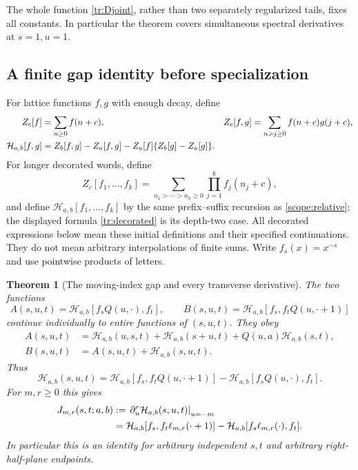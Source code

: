 \documentclass[11pt,letterpaper]{article}
\numberwithin{equation}{section}
\theoremstyle{plain}
\newtheorem{theorem}{Theorem}[section]
\theoremstyle{definition}
\theoremstyle{remark}
\newcommand{\HH}{\mathcal H}
\begin{document}
The whole function \eqref{tr:Djoint}, rather than two separately
regularized tails, fixes all constants. In particular the theorem covers
simultaneous spectral derivatives at $s=1,u=1$.

\subsection{A finite gap identity before specialization}

For lattice functions $f,g$ with enough decay, define
\begin{align}
 Z_c[f]&=\sum_{n\geq0}f(n+c),&
 Z_c[f,g]&=\sum_{n>j\geq0}f(n+c)g(j+c),\notag\\
 \HH_{a,b}[f,g]
   &=Z_b[f,g]-Z_a[f,g]-Z_a[f]\{Z_b[g]-Z_a[g]\}.
 \label{tr:decorated}
\end{align}
For longer decorated words, define
\[
 Z_c[f_1,\ldots,f_k]
   =\sum_{n_1>\cdots>n_k\geq0}\prod_{j=1}^k f_j(n_j+c),
\]
and define $\HH_{a,b}[f_1,\ldots,f_k]$ by the same
prefix--suffix recursion as \eqref{scope:relative}; the displayed
formula \eqref{tr:decorated} is its depth-two case.
All decorated expressions below mean these initial definitions and their
specified continuations. They do not mean arbitrary interpolations of
finite sums. Write $f_s(x)=x^{-s}$ and use pointwise products of letters.

\begin{theorem}[The moving-index gap and every transverse derivative]
\label{tr:gap}
The two functions
\[
 A(s,u,t)=\HH_{a,b}[f_sQ(u,\cdot),f_t],\qquad
 B(s,u,t)=\HH_{a,b}[f_s,f_tQ(u,\cdot+1)]
\]
continue individually to entire functions of $(s,u,t)$. They obey
\begin{align}
 A(s,u,t)
   &=\HH_{a,b}(u,s,t)+\HH_{a,b}(s+u,t)
                      +Q(u,a)\HH_{a,b}(s,t),\label{tr:A}\\
 B(s,u,t)&=A(s,u,t)+\HH_{a,b}(s,u,t).\label{tr:B}
\end{align}
Thus
\begin{equation}\label{tr:genericgap}
 \boxed{\HH_{a,b}(s,u,t)
   =\HH_{a,b}[f_s,f_tQ(u,\cdot+1)]
       -\HH_{a,b}[f_sQ(u,\cdot),f_t].}
\end{equation}
For $m,r\geq0$ this gives
\begin{align}
 J_{m,r}(s,t;a,b)
 &:=\left.\partial_u^r\HH_{a,b}(s,u,t)\right|_{u=-m}\notag\\
 &=\HH_{a,b}[f_s,f_t\ell_{m,r}(\cdot+1)]
      -\HH_{a,b}[f_s\ell_{m,r}(\cdot),f_t].
 \label{tr:J}
\end{align}
In particular this is an identity for arbitrary independent $s,t$ and
arbitrary right-half-plane endpoints.
\end{theorem}
\end{document}
